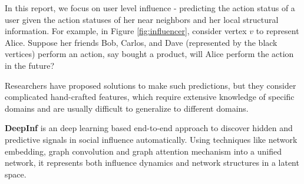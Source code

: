 In this report, we focus on user level influence - predicting the action status of a user given the action statuses of her near neighbors and her local structural information. For example, in Figure \ref{fig:influencer}, consider vertex $v$ to represent Alice. Suppose her friends Bob, Carlos, and Dave (represented by the black vertices) perform an action, say bought a product, will Alice perform the action in the future?


Researchers have proposed solutions to make such predictions, but they consider complicated hand-crafted features, which require extensive knowledge of specific domains and are usually difficult to generalize to different domains.


\textbf{DeepInf} is an deep learning based end-to-end approach to discover hidden and predictive signals in social influence automatically. Using techniques like network embedding, graph convolution and graph attention mechanism into a unified network, it represents both influence dynamics and network structures in a latent space.

